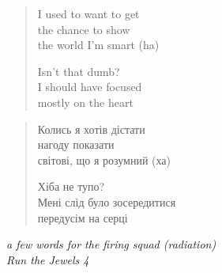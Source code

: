 \clearpage\thispagestyle{empty}\vspace*{\fill}

\begin{verse}
I used to want to get \\
the chance to show \\
the world I'm smart (ha)

Isn't that dumb? \\
I should have focused \\
mostly on the heart
\end{verse}
\begin{verse}\small
Колись я хотів дістати \\
нагоду показати \\
світові, що я розумний (ха)

Хіба не тупо? \\
Мені слід було зосередитися \\
передусім на серці
\end{verse}
\begin{flushright}\small\itshape
a few words for the firing squad (radiation) \\
Run the Jewels 4
\end{flushright}

\vspace*{\fill}\clearpage
